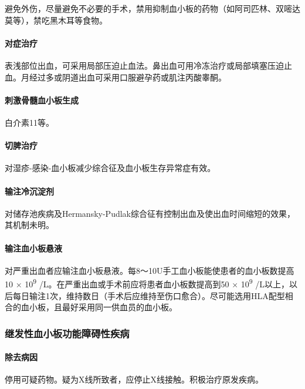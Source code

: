 避免外伤，尽量避免不必要的手术，禁用抑制血小板的药物（如阿司匹林、双嘧达莫等），禁吃黑木耳等食物。

\paragraph{对症治疗}

表浅部位出血，可采用局部压迫止血法。鼻出血可用冷冻治疗或局部填塞压迫止血。月经过多或阴道出血可采用口服避孕药或肌注丙酸睾酮。

\paragraph{刺激骨髓血小板生成}

白介素11等。

\paragraph{切脾治疗}

对湿疹-感染-血小板减少综合征及血小板生存异常症有效。

\paragraph{输注冷沉淀剂}

对储存池疾病及Hermansky-Pudlak综合征有控制出血及使出血时间缩短的效果，其机制未明。

\paragraph{输注血小板悬液}

对严重出血者应输注血小板悬液。每8～10U手工血小板能使患者的血小板数提高10
× 10\textsuperscript{9} /L。在严重出血或手术前应将患者血小板数提高到50 ×
10\textsuperscript{9}
/L以上，以后每日输注1次，维持数日（手术后应维持至伤口愈合）。尽可能选用HLA配型相合的血小板，且最好采用同一供血员的血小板。

\subsubsection{继发性血小板功能障碍性疾病}

\paragraph{除去病因}

停用可疑药物。疑为X线所致者，应停止X线接触。积极治疗原发疾病。

